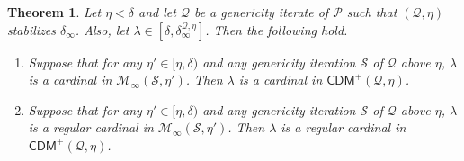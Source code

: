 \documentclass{amsart}
\newtheorem{thm}[dfn]{Theorem}
\begin{document}
\begin{thm}
Let $\eta<\delta$ and let $\mathcal{Q}$ be a genericity iterate of $\mathcal{P}$ such that $(\mathcal{Q}, \eta)$ stabilizes $\delta_{\infty}$.
Also, let $\lambda\in[\delta, \delta^{\mathcal{Q}, \eta}_{\infty}]$.
Then the following hold.
\begin{enumerate}
\item Suppose that for any $\eta'\in [\eta, \delta)$ and any genericity iteration $\mathcal{S}$ of $\mathcal{Q}$ above $\eta$, $\lambda$ is a cardinal in $\mathcal{M}_{\infty}(\mathcal{S}, \eta')$.
Then $\lambda$ is a cardinal in $\mathsf{CDM}^{+}(\mathcal{Q}, \eta)$.
\item Suppose that for any $\eta'\in [\eta, \delta)$ and any genericity iteration $\mathcal{S}$ of $\mathcal{Q}$ above $\eta$, $\lambda$ is a regular cardinal in $\mathcal{M}_{\infty}(\mathcal{S}, \eta')$.
Then $\lambda$ is a regular cardinal in $\mathsf{CDM}^{+}(\mathcal{Q}, \eta)$.
\end{enumerate}
\end{thm}
\end{document}
